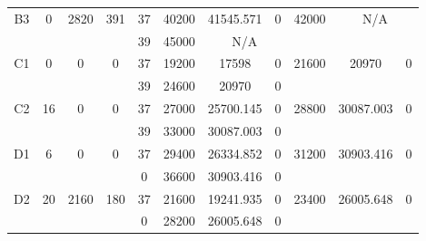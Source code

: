 \begin{sidewaystable}
\begin{tabular}{c||c|c|c||c|c|c|c||c|c|c}
         &
        
      \\
      \hline
      \multirow{2}{*}{B3} &
      \multirow{2}{*}{0} &
      \multirow{2}{*}{2820} &
      \multirow{2}{*}{391} &
      37 &
      40200 &
        41545.571 &
        0 &
      \multirow{2}{*}{42000} &
        \multicolumn{2}{c}{\multirow{2}{*}{N/A}}
      \\
      \cline{5-8}
       &
       &
       &
       &
      39 &
      45000 &
        \multicolumn{2}{|c||}{N/A} &
      
        
      \\
      \hline
      \multirow{2}{*}{C1} &
      \multirow{2}{*}{0} &
      \multirow{2}{*}{0} &
      \multirow{2}{*}{0} &
      37 &
      19200 &
        17598 &
        0 &
      \multirow{2}{*}{21600} &
        \multirow{2}{*}{20970} &
        \multirow{2}{*}{0}
      \\
      \cline{5-8}
       &
       &
       &
       &
      39 &
      24600 &
        20970 &
        0 &
      
         &
        
      \\
      \hline
      \multirow{2}{*}{C2} &
      \multirow{2}{*}{16} &
      \multirow{2}{*}{0} &
      \multirow{2}{*}{0} &
      37 &
      27000 &
        25700.145 &
        0 &
      \multirow{2}{*}{28800} &
        \multirow{2}{*}{30087.003} &
        \multirow{2}{*}{0}
      \\
      \cline{5-8}
       &
       &
       &
       &
      39 &
      33000 &
        30087.003 &
        0 &
      
         &
        
      \\
      \hline
      \multirow{2}{*}{D1} &
      \multirow{2}{*}{6} &
      \multirow{2}{*}{0} &
      \multirow{2}{*}{0} &
      37 &
      29400 &
        26334.852 &
        0 &
      \multirow{2}{*}{31200} &
        \multirow{2}{*}{30903.416} &
        \multirow{2}{*}{0}
      \\
      \cline{5-8}
       &
       &
       &
       &
      0 &
      36600 &
        30903.416 &
        0 &
      
         &
        
      \\
      \hline
      \multirow{2}{*}{D2} &
      \multirow{2}{*}{20} &
      \multirow{2}{*}{2160} &
      \multirow{2}{*}{180} &
      37 &
      21600 &
        19241.935 &
        0 &
      \multirow{2}{*}{23400} &
        \multirow{2}{*}{26005.648} &
        \multirow{2}{*}{0}
      \\
      \cline{5-8}
       &
       &
       &
       &
      0 &
      28200 &
        26005.648 &
        0 &
      

\end{tabular}
\end{sidewaystable}
